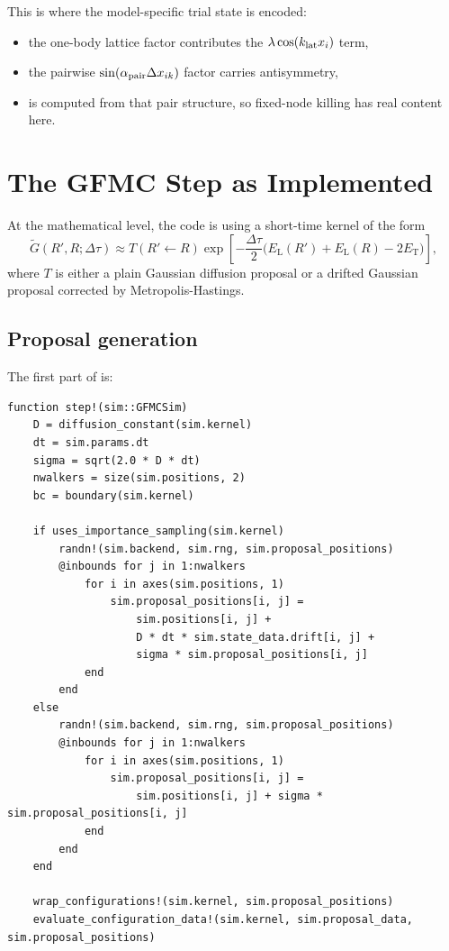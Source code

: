 \documentclass[11pt]{article}
\newcommand{\code}[1]{\texttt{\detokenize{#1}}}
\newcommand{\dtau}{\Delta\tau}
\newcommand{\ET}{E_{\mathrm{T}}}
\newcommand{\EL}{E_{\mathrm{L}}}
\begin{document}
This is where the model-specific trial state is encoded:
\begin{itemize}
    \item the one-body lattice factor contributes the $\lambda \cos(k_{\rm lat}x_i)$
    term,
    \item the pairwise $\sin(\alpha_{\rm pair} \Delta x_{ik})$ factor carries
    antisymmetry,
    \item \code{sign\_j} is computed from that pair structure, so fixed-node
    killing has real content here.
\end{itemize}

\section{The GFMC Step as Implemented}

At the mathematical level, the code is using a short-time kernel of the form
\begin{equation}
\widetilde G(R',R;\dtau)
\approx
T(R' \leftarrow R)
\exp\left[
-\frac{\dtau}{2}\bigl(\EL(R')+\EL(R)-2\ET\bigr)
\right],
\end{equation}
where $T$ is either a plain Gaussian diffusion proposal or a drifted Gaussian
proposal corrected by Metropolis-Hastings.

\subsection{Proposal generation}

The first part of \code{step!} is:

\begin{lstlisting}[style=codeblock,caption={Proposal generation in \code{src/UseCases/gfmc/run.jl}}]
function step!(sim::GFMCSim)
    D = diffusion_constant(sim.kernel)
    dt = sim.params.dt
    sigma = sqrt(2.0 * D * dt)
    nwalkers = size(sim.positions, 2)
    bc = boundary(sim.kernel)

    if uses_importance_sampling(sim.kernel)
        randn!(sim.backend, sim.rng, sim.proposal_positions)
        @inbounds for j in 1:nwalkers
            for i in axes(sim.positions, 1)
                sim.proposal_positions[i, j] =
                    sim.positions[i, j] +
                    D * dt * sim.state_data.drift[i, j] +
                    sigma * sim.proposal_positions[i, j]
            end
        end
    else
        randn!(sim.backend, sim.rng, sim.proposal_positions)
        @inbounds for j in 1:nwalkers
            for i in axes(sim.positions, 1)
                sim.proposal_positions[i, j] =
                    sim.positions[i, j] + sigma * sim.proposal_positions[i, j]
            end
        end
    end

    wrap_configurations!(sim.kernel, sim.proposal_positions)
    evaluate_configuration_data!(sim.kernel, sim.proposal_data, sim.proposal_positions)
\end{lstlisting}
\end{document}
